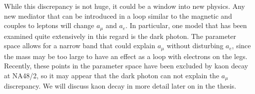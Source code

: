 While this discrepancy is not huge, it could be a window into new physics.
Any new mediator that can be introduced in a loop similar to the magnetic and couples to leptons will change $a_\mu$ and $a_e$.
In particular, one model that has been examined quite extensively in this regard is the dark photon.
The parameter space allows for a narrow band that could explain $a_\mu$ without disturbing $a_e$, since the mass may be too large to have an effect as a loop with electrons on the legs.
Recently, these points in the parameter space have been excluded by kaon decay at NA48/2, so it may appear that the dark photon can not explain the $a_\mu$ discrepancy.
We will discuss kaon decay in more detail later on in the thesis.
